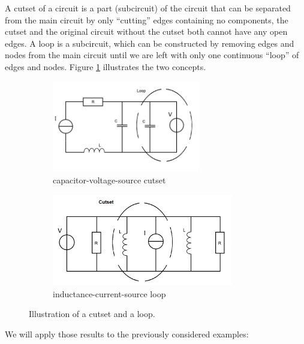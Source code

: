 A cutset of a circuit is a part (subcircuit) of the circuit that can be separated from the main circuit by only ``cutting'' edges containing no components, the cutset and the original circuit without the cutset both cannot have any open edges. A loop is a subcircuit, which can be constructed by removing edges and nodes from the main circuit until we are left with only one continuous ``loop'' of edges and nodes. Figure \ref{fig:cutset and loop} illustrates the two concepts.

\begin{figure}[H]
	\begin{subfigure}{0.5\textwidth}
			\centering
			\includegraphics[height=4cm]{pictures/inductance-current-source_cutset.png}
			\caption{capacitor-voltage-source cutset}
		\end{subfigure}
	\begin{subfigure}{0.5\textwidth}
			\centering
			\includegraphics[height=4cm]{pictures/capacitance-voltage-source_loop.png}
			\caption{inductance-current-source loop}
		\end{subfigure}
	\caption{Illustration of a cutset and a loop.}
	\label{fig:cutset and loop}
\end{figure}

We will apply those results to the previously considered examples: 

